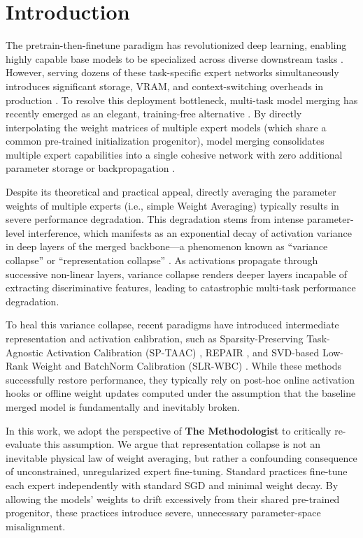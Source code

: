 \documentclass{article}
\theoremstyle{plain}
\theoremstyle{definition}
\theoremstyle{remark}
\begin{document}
\section{Introduction}
The pretrain-then-finetune paradigm has revolutionized deep learning, enabling highly capable base models to be specialized across diverse downstream tasks \cite{Vaswani2017, Caruana1997, Donahue2014}. However, serving dozens of these task-specific expert networks simultaneously introduces significant storage, VRAM, and context-switching overheads in production \cite{Ruder2017, Collobert2008}. To resolve this deployment bottleneck, multi-task model merging has recently emerged as an elegant, training-free alternative \cite{Wortsman2022, Choshen2022, Tang2023}. By directly interpolating the weight matrices of multiple expert models (which share a common pre-trained initialization progenitor), model merging consolidates multiple expert capabilities into a single cohesive network with zero additional parameter storage or backpropagation \cite{Ilharco2023, Jin2023b, Matena2022}.

Despite its theoretical and practical appeal, directly averaging the parameter weights of multiple experts (i.e., simple Weight Averaging) typically results in severe performance degradation. This degradation stems from intense parameter-level interference, which manifests as an exponential decay of activation variance in deep layers of the merged backbone---a phenomenon known as ``variance collapse'' or ``representation collapse'' \cite{Jordan2023, Sengupta2023, Mu2024}. As activations propagate through successive non-linear layers, variance collapse renders deeper layers incapable of extracting discriminative features, leading to catastrophic multi-task performance degradation.

To heal this variance collapse, recent paradigms have introduced intermediate representation and activation calibration, such as Sparsity-Preserving Task-Agnostic Activation Calibration (SP-TAAC) \cite{Anonymous2023}, REPAIR \cite{Jordan2023}, and SVD-based Low-Rank Weight and BatchNorm Calibration (SLR-WBC) \cite{Anonymous2024c}. While these methods successfully restore performance, they typically rely on post-hoc online activation hooks or offline weight updates computed under the assumption that the baseline merged model is fundamentally and inevitably broken.

In this work, we adopt the perspective of \textbf{The Methodologist} to critically re-evaluate this assumption. We argue that representation collapse is not an inevitable physical law of weight averaging, but rather a confounding consequence of unconstrained, unregularized expert fine-tuning. Standard practices fine-tune each expert independently with standard SGD and minimal weight decay. By allowing the models' weights to drift excessively from their shared pre-trained progenitor, these practices introduce severe, unnecessary parameter-space misalignment.
\end{document}
